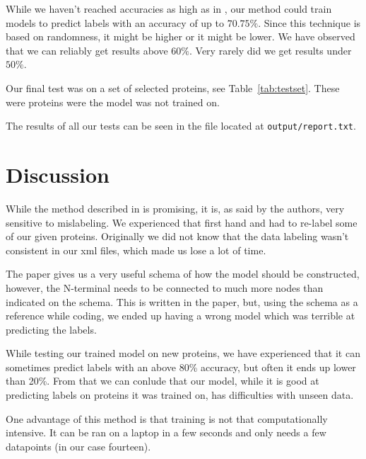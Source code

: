 \documentclass[
	a4paper, %
	11pt, %
	unnumberedsections, %
	twoside, %
  ]{LTJournalArticle}
\begin{document}
While we haven't reached accuracies as high as in \cite{bagos_hidden_2004}, our method could train models to predict labels with an accuracy of up to $70.75\%$. Since this technique is based on randomness, it might be higher or it might be lower. We have observed that we can reliably get results above $60\%$. Very rarely did we get results under $50\%$.

Our final test was on a set of selected proteins, see Table~\ref{tab:testset}. These were proteins were the model was not trained on.

The results of all our tests can be seen in the file located at \texttt{output/report.txt}.




\section{Discussion}

While the method described in \cite{bagos_hidden_2004} is promising, it is, as said by the authors, very sensitive to mislabeling. We experienced that first hand and had to re-label some of our given proteins. Originally we did not know that the data labeling wasn't consistent in our xml files, which made us lose a lot of time.

The paper \cite{bagos_hidden_2004} gives us a very useful schema of how the model should be constructed, however, the N-terminal needs to be connected to much more nodes than indicated on the schema. This is written in the paper, but, using the schema as a reference while coding, we ended up having a wrong model which was terrible at predicting the labels.

While testing our trained model on new proteins, we have experienced that it can sometimes predict labels with an above 80\% accuracy, but often it ends up lower than 20\%. From that we can conlude that our model, while it is good at predicting labels on proteins it was trained on, has difficulties with unseen data.

One advantage of this method is that training is not that computationally intensive. It can be ran on a laptop in a few seconds and only needs a few datapoints (in our case fourteen).


\printbibliography%
\end{document}
